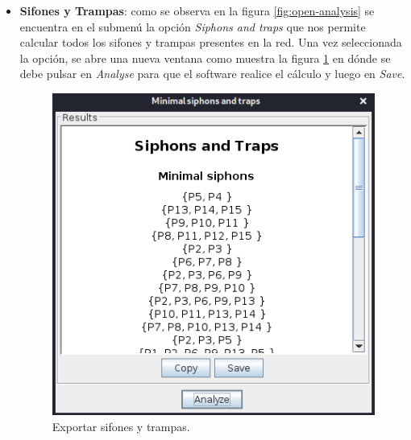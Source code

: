 \begin{itemize}
\begin{itemize}
        \item \textbf{Sifones y Trampas}: como se observa en la figura \ref{fig:open-analysis} se encuentra en el submenú la opción \textit{Siphons and traps} que nos permite calcular todos los sifones y trampas presentes en la red.
        Una vez seleccionada la opción, se abre una nueva ventana como muestra la figura \ref{fig:ext-tys} en dónde se debe pulsar en \textit{Analyse} para que el software realice el cálculo y luego en \textit{Save}.
        \begin{figure} [H]
            \centering
            \includegraphics[scale=0.7]{Figures/petrinator/sifones.png}
            \caption{Exportar sifones y trampas.}
            \label{fig:ext-tys}
        \end{figure}
        
    \end{itemize}
    
  
\end{itemize}